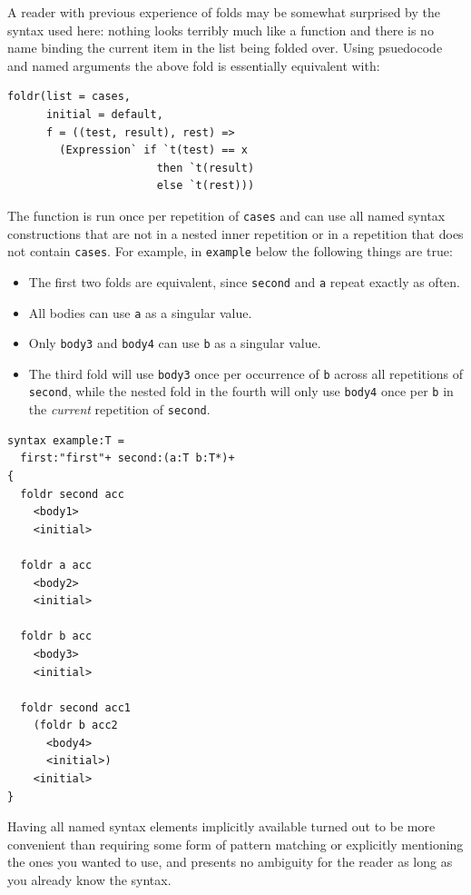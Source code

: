 \documentclass{kththesis}
\begin{document}
A reader with previous experience of folds may be somewhat surprised by the syntax used here: nothing looks terribly much like a function and there is no name binding the current item in the list being folded over. Using psuedocode and named arguments the above fold is essentially equivalent with:

\begin{verbatim}
foldr(list = cases,
      initial = default,
      f = ((test, result), rest) =>
        (Expression` if `t(test) == x
                       then `t(result)
                       else `t(rest)))
\end{verbatim}

The function is run once per repetition of \texttt{cases} and can use all named syntax constructions that are not in a nested inner repetition or in a repetition that does not contain \texttt{cases}. For example, in \texttt{example} below the following things are true:
\begin{itemize}
  \item The first two folds are equivalent, since \texttt{second} and \texttt{a} repeat exactly as often.
  \item All bodies can use \texttt{a} as a singular value.
  \item Only \texttt{body3} and \texttt{body4} can use \texttt{b} as a singular value.
  \item The third fold will use \texttt{body3} once per occurrence of \texttt{b} across all repetitions of \texttt{second}, while the nested fold in the fourth will only use \texttt{body4} once per \texttt{b} in the \emph{current} repetition of \texttt{second}.
\end{itemize}

\begin{verbatim}
syntax example:T =
  first:"first"+ second:(a:T b:T*)+
{
  foldr second acc
    <body1>
    <initial>

  foldr a acc
    <body2>
    <initial>

  foldr b acc
    <body3>
    <initial>

  foldr second acc1
    (foldr b acc2
      <body4>
      <initial>)
    <initial>
}
\end{verbatim}

Having all named syntax elements implicitly available turned out to be more convenient than requiring some form of pattern matching or explicitly mentioning the ones you wanted to use, and presents no ambiguity for the reader as long as you already know the syntax.
\end{document}
